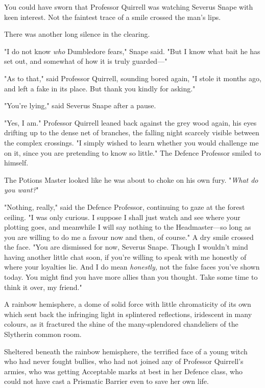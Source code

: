 You could have sworn that Professor Quirrell was watching Severus Snape with
keen interest. Not the faintest trace of a smile crossed the man's lips.

There was another long silence in the clearing.

"I do not know \emph{who} Dumbledore fears," Snape said. "But I know what bait
he has set out, and somewhat of how it is truly guarded---"

"As to that," said Professor Quirrell, sounding bored again, "I stole it months
ago, and left a fake in its place. But thank you kindly for asking."

"You're lying," said Severus Snape after a pause.

"Yes, I am." Professor Quirrell leaned back against the grey wood again, his
eyes drifting up to the dense net of branches, the falling night scarcely
visible between the complex crossings. "I simply wished to learn whether you
would challenge me on it, since you are pretending to know so little." The Defence
Professor smiled to himself.

The Potions Master looked like he was about to choke on his own fury.
"\emph{What do you want?}"

"Nothing, really," said the Defence Professor, continuing to gaze at the forest
ceiling. "I was only curious. I suppose I shall just watch and see where your
plotting goes, and meanwhile I will say nothing to the Headmaster---so long as
you are willing to do me a favour now and then, of course." A dry smile crossed
the face. "You are dismissed for now, Severus Snape. Though I wouldn't mind
having another little chat soon, if you're willing to speak with me honestly of
where your loyalties lie. And I do mean \emph{honestly,} not the false faces
you've shown today. You might find you have more allies than you thought. Take
some time to think it over, my friend."

A rainbow hemisphere, a dome of solid force with little chromaticity of its own
which sent back the infringing light in splintered reflections, iridescent in
many colours, as it fractured the shine of the many-splendored chandeliers of
the Slytherin common room.

Sheltered beneath the rainbow hemisphere, the terrified face of a young witch
who had never fought bullies, who had not joined any of Professor Quirrell's
armies, who was getting Acceptable marks at best in her Defence class, who
could not have cast a Prismatic Barrier even to save her own life.

